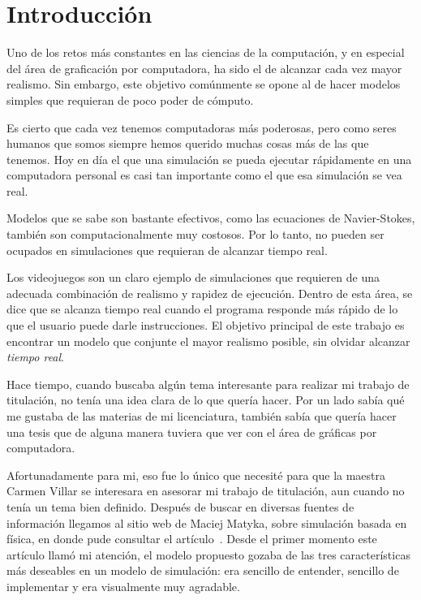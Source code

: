 \chapter*{Introducción}

Uno de los retos más constantes en las ciencias de la computación, y en especial del área de graficación por computadora, ha sido el de alcanzar cada vez mayor realismo.
Sin embargo, este objetivo comúnmente se opone al de hacer modelos simples que requieran de poco poder de cómputo.

Es cierto que cada vez tenemos computadoras más poderosas, pero como seres humanos que somos siempre hemos querido muchas cosas más de las que tenemos.
Hoy en día el que una simulación se pueda ejecutar rápidamente en una computadora personal es casi tan importante como el que esa simulación se vea real.

Modelos que se sabe son bastante efectivos, como las ecuaciones de Navier-Stokes, también son computacionalmente muy costosos.
Por lo tanto, no pueden ser ocupados en simulaciones que requieran de alcanzar tiempo real.

Los videojuegos son un claro ejemplo de simulaciones que requieren de una adecuada combinación de realismo y rapidez de ejecución.
Dentro de esta área, se dice que se alcanza tiempo real cuando el programa responde más rápido de lo que el usuario puede darle instrucciones.
El objetivo principal de este trabajo es encontrar un modelo que conjunte el mayor realismo posible, sin olvidar alcanzar \emph{tiempo real}.

Hace tiempo, cuando buscaba algún tema interesante para realizar mi trabajo de titulación, no tenía una idea clara de lo que quería hacer.
Por un lado sabía qué me gustaba de las materias de mi licenciatura, también sabía que quería hacer una tesis que de alguna manera tuviera que ver con el área de gráficas por computadora.

Afortunadamente para mi, eso fue lo único que necesité para que la maestra Carmen Villar se interesara en asesorar mi trabajo de titulación, aun cuando no tenía un tema bien definido.
Después de buscar en diversas fuentes de información llegamos al sitio web de Maciej Matyka, sobre simulación basada en física, en donde pude consultar el artículo~\cite{Matyka:Presion}.
Desde el primer momento este artículo llamó  mi atención, el modelo propuesto gozaba de las tres características más deseables en un modelo de simulación: era sencillo de entender, sencillo de implementar y era visualmente muy agradable.

